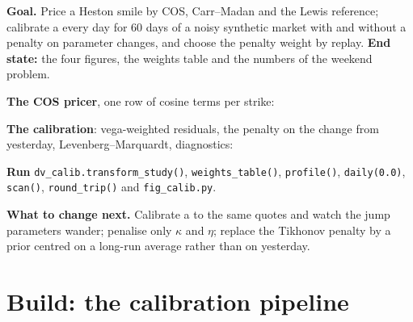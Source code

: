 \begin{tutorial}
\textbf{Goal.} Price a Heston smile by COS, Carr--Madan and the Lewis reference; calibrate a  every day for 60 days of a noisy
synthetic market with and without a penalty on parameter changes, and choose the penalty weight by replay. \textbf{End state:} the four figures,
the weights table and the numbers of the weekend problem.
\begin{tutsteps}
\item \textbf{The COS pricer}, one row of cosine terms per strike:
\label{lst:dv:fourier-pricing-and-calibration-engineering:cos}
\item \textbf{The calibration}: vega-weighted residuals, the penalty on the change from yesterday, Levenberg--Marquardt, diagnostics:
\label{lst:dv:fourier-pricing-and-calibration-engineering:calib}
\item \textbf{Run} \texttt{dv\_calib.transform\_study()}, \texttt{weights\_table()}, \texttt{profile()}, \texttt{daily(0.0)}, \texttt{scan()},
\texttt{round\_trip()} and \texttt{fig\_calib.py}.
\end{tutsteps}
\textbf{What to change next.} Calibrate a  to the same quotes and watch the jump parameters wander; penalise only $\kappa$ and $\eta$;
replace the Tikhonov penalty by a prior centred on a long-run average rather than on yesterday.
\end{tutorial}

\section{Build: the calibration pipeline}\label{bld:dv:fourier-pricing-and-calibration-engineering:calib}

